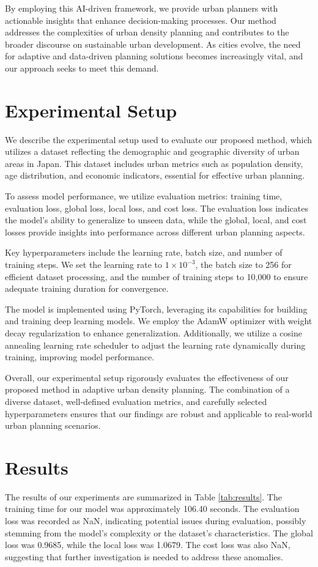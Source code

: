 \documentclass{article} %
\begin{document}
By employing this AI-driven framework, we provide urban planners with actionable insights that enhance decision-making processes. Our method addresses the complexities of urban density planning and contributes to the broader discourse on sustainable urban development. As cities evolve, the need for adaptive and data-driven planning solutions becomes increasingly vital, and our approach seeks to meet this demand.

\section{Experimental Setup}
\label{sec:experimental}

We describe the experimental setup used to evaluate our proposed method, which utilizes a dataset reflecting the demographic and geographic diversity of urban areas in Japan. This dataset includes urban metrics such as population density, age distribution, and economic indicators, essential for effective urban planning.

To assess model performance, we utilize evaluation metrics: training time, evaluation loss, global loss, local loss, and cost loss. The evaluation loss indicates the model's ability to generalize to unseen data, while the global, local, and cost losses provide insights into performance across different urban planning aspects.

Key hyperparameters include the learning rate, batch size, and number of training steps. We set the learning rate to \(1 \times 10^{-3}\), the batch size to 256 for efficient dataset processing, and the number of training steps to 10,000 to ensure adequate training duration for convergence.

The model is implemented using PyTorch, leveraging its capabilities for building and training deep learning models. We employ the AdamW optimizer \citep{loshchilov2017adamw} with weight decay regularization to enhance generalization. Additionally, we utilize a cosine annealing learning rate scheduler to adjust the learning rate dynamically during training, improving model performance.

Overall, our experimental setup rigorously evaluates the effectiveness of our proposed method in adaptive urban density planning. The combination of a diverse dataset, well-defined evaluation metrics, and carefully selected hyperparameters ensures that our findings are robust and applicable to real-world urban planning scenarios.

\section{Results}
\label{sec:results}
The results of our experiments are summarized in Table \ref{tab:results}. The training time for our model was approximately 106.40 seconds. The evaluation loss was recorded as NaN, indicating potential issues during evaluation, possibly stemming from the model's complexity or the dataset's characteristics. The global loss was 0.9685, while the local loss was 1.0679. The cost loss was also NaN, suggesting that further investigation is needed to address these anomalies.
\end{document}
